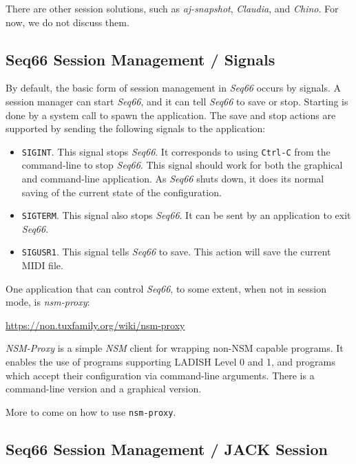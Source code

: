    There are other session solutions, such as \textsl{aj-snapshot},
   \textsl{Claudia}, and \textsl{Chino}.
   For now, we do not discuss them.

\subsection{Seq66 Session Management / Signals}
\label{subsec:sessions_signals}

   By default, the basic form of session management in
   \textsl{Seq66} occurs by signals.  A
   session manager can start \textsl{Seq66}, and it can tell \textsl{Seq66} to
   save or stop.  Starting is done by a system call to spawn the application.
   The save and stop actions are supported by sending the following signals to
   the application:

   \begin{itemize}
      \item \texttt{SIGINT}.
         This signal stops \textsl{Seq66}. It corresponds
         to using \texttt{Ctrl-C} from the command-line to stop \textsl{Seq66}.
         This signal should work for both the graphical and command-line
         application.  As \textsl{Seq66} shuts down, it does its normal saving
         of the current state of the configuration.
      \item \texttt{SIGTERM}.
         This signal also stops \textsl{Seq66}.  It can
         be sent by an application to exit \textsl{Seq66}.
      \item \texttt{SIGUSR1}.
         This signal tells \textsl{Seq66} to save.  This
         action will save the current MIDI file.
   \end{itemize}

   One application that can control \textsl{Seq66}, to some extent, when not in
   session mode, is \textsl{nsm-proxy}:

      \url{https://non.tuxfamily.org/wiki/nsm-proxy}

   \textsl{NSM-Proxy} is a simple \textsl{NSM} client for wrapping non-NSM
   capable programs. It enables the use of programs supporting LADISH Level 0
   and 1, and programs which accept their configuration via command-line
   arguments.  There is a command-line version and a graphical version.

   More to come on how to use \texttt{nsm-proxy}.

\subsection{Seq66 Session Management / JACK Session}
\label{subsec:sessions_jack}

